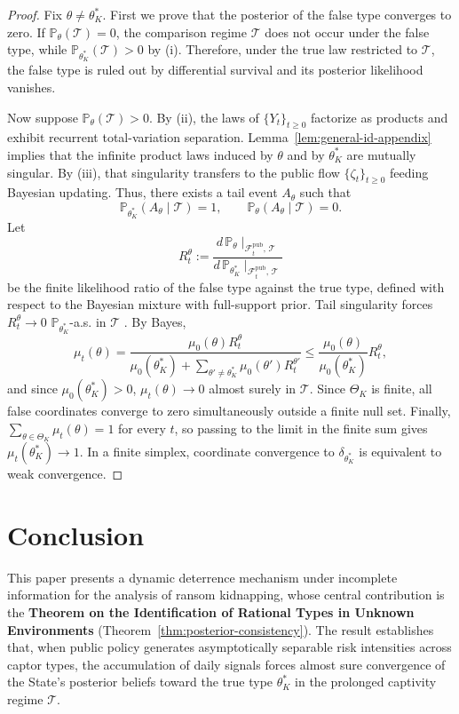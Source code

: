 \documentclass[12pt,a4paper]{article}
\providecommand{\textcite}{\citet}
\theoremstyle{plain}
\theoremstyle{definition}
\theoremstyle{remark}
\newcommand{\ProbC}[1]{\mathbb{P}_{#1}}
\newcommand{\1}{\mathbf{1}}
\begin{document}
\begin{proof}
Fix $\theta\neq\theta_K^\ast$. First we prove that the posterior of the false type
converges to zero. If $\ProbC{\theta}(\mathcal{T})=0$, the comparison regime
$\mathcal{T}$ does not occur under the false type, while
$\ProbC{\theta_K^\ast}(\mathcal{T})>0$ by \textup{(i)}. Therefore, under the true law
restricted to $\mathcal{T}$, the false type is ruled out by differential survival and
its posterior likelihood vanishes.

Now suppose $\ProbC{\theta}(\mathcal{T})>0$. By \textup{(ii)}, the laws of
$\{Y_t\}_{t\ge0}$ factorize as products and exhibit recurrent total-variation
separation. Lemma~\ref{lem:general-id-appendix} implies that the infinite product laws
induced by $\theta$ and by $\theta_K^\ast$ are mutually singular. By \textup{(iii)}, that
singularity transfers to the public flow $\{\zeta_t\}_{t\ge0}$ feeding Bayesian
updating. Thus, there exists a tail event $A_\theta$ such that
\[
\ProbC{\theta_K^\ast}(A_\theta\mid\mathcal{T})=1,
\qquad
\ProbC{\theta}(A_\theta\mid\mathcal{T})=0.
\]
Let
\[
R_t^\theta
:=
\frac{d\,\ProbC{\theta}\!\mid_{\mathcal{F}_t^{\mathrm{pub}},\,\mathcal{T}}}
     {d\,\ProbC{\theta_K^\ast}\!\mid_{\mathcal{F}_t^{\mathrm{pub}},\,\mathcal{T}}}
\]
be the finite likelihood ratio of the false type against the true type, defined with
respect to the Bayesian mixture with full-support prior. Tail singularity forces
$R_t^\theta\to0$ $\ProbC{\theta_K^\ast}$-a.s. in $\mathcal{T}$
\textcite{BlackwellDubins1962,Schervish1995Theory}. By Bayes,
\[
\mu_t(\theta)
=
\frac{\mu_0(\theta)R_t^\theta}
{\mu_0(\theta_K^\ast)+\sum_{\theta'\neq\theta_K^\ast}\mu_0(\theta')R_t^{\theta'}}
\le
\frac{\mu_0(\theta)}{\mu_0(\theta_K^\ast)}R_t^\theta,
\]
and since $\mu_0(\theta_K^\ast)>0$, $\mu_t(\theta)\to0$ almost surely in
$\mathcal{T}$. Since $\Theta_K$ is finite, all false coordinates converge to zero
simultaneously outside a finite null set. Finally, $\sum_{\theta\in\Theta_K}\mu_t(\theta)=1$
for every $t$, so passing to the limit in the finite sum gives
$\mu_t(\theta_K^\ast)\to1$. In a finite simplex, coordinate convergence to
$\delta_{\theta_K^\ast}$ is equivalent to weak convergence.
\end{proof}

\section{Conclusion}
\label{sec:conclusion}

This paper presents a dynamic deterrence mechanism under incomplete information for the
analysis of ransom kidnapping, whose central contribution is the
\textbf{Theorem on the Identification of Rational Types in Unknown Environments}
(Theorem~\ref{thm:posterior-consistency}). The result establishes that, when public
policy generates asymptotically separable risk intensities across captor types, the
accumulation of daily signals forces almost sure convergence of the State's posterior
beliefs toward the true type $\theta_K^\ast$ in the prolonged captivity regime
$\mathcal{T}$.
\end{document}
